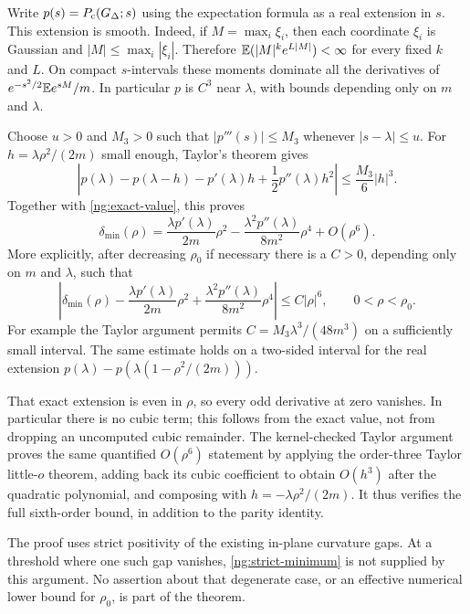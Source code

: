 Write $p(s)=P_{\mathrm c}(G_\Delta;s)$ using the expectation formula as a real
extension in $s$. This extension is smooth. Indeed, if
$M=\max_i\xi_i$, then each coordinate $\xi_i$ is Gaussian and
$|M|\le\max_i|\xi_i|$. Therefore
$\mathbb E(|M|^k e^{L|M|})<\infty$ for every fixed $k$ and $L$.
On compact $s$-intervals these moments dominate all the derivatives of
$e^{-s^2/2}\mathbb E e^{sM}/m$. In particular $p$ is $C^3$ near $\lambda$,
with bounds depending only on $m$ and $\lambda$.

Choose $u>0$ and $M_3>0$ such that
$|p'''(s)|\le M_3$ whenever $|s-\lambda|\le u$.
For $h=\lambda\rho^2/(2m)$ small enough, Taylor's theorem gives
\[
 \left|p(\lambda)-p(\lambda-h)
       -p'(\lambda)h+\frac12p''(\lambda)h^2\right|
       \le\frac{M_3}{6}|h|^3.
\]
Together with \eqref{ng:exact-value}, this proves
\begin{equation}\label{ng:O6}
 \delta_{\min}(\rho)
 =\frac{\lambda p'(\lambda)}{2m}\rho^2
    -\frac{\lambda^2p''(\lambda)}{8m^2}\rho^4+O(\rho^6).
\end{equation}
More explicitly, after decreasing $\rho_0$ if necessary there is a
$C>0$, depending only on $m$ and $\lambda$, such that
\begin{equation}\label{ng:quantified-remainder}
 \left|\delta_{\min}(\rho)
       -\frac{\lambda p'(\lambda)}{2m}\rho^2
       +\frac{\lambda^2p''(\lambda)}{8m^2}\rho^4\right|
 \le C|\rho|^6,\qquad 0<\rho<\rho_0.
\end{equation}
For example the Taylor argument permits $C=M_3\lambda^3/(48m^3)$
on a sufficiently small interval. The same estimate holds on a
two-sided interval for the real extension
$p(\lambda)-p(\lambda(1-\rho^2/(2m)))$.

That exact extension is even in $\rho$, so every odd derivative at zero
vanishes. In particular there is no cubic term; this follows from the
exact value, not from dropping an uncomputed cubic remainder.
The kernel-checked Taylor argument proves the same quantified
$O(\rho^6)$ statement by applying the order-three Taylor little-$o$
theorem, adding back its cubic coefficient to obtain
$O(h^3)$ after the quadratic polynomial, and composing with
$h=-\lambda\rho^2/(2m)$. It thus verifies the full sixth-order bound,
in addition to the parity identity.

The proof uses strict positivity of the existing in-plane curvature
gaps. At a threshold where one such gap vanishes,
\eqref{ng:strict-minimum} is not supplied by this argument.
No assertion about that degenerate case, or an effective numerical
lower bound for $\rho_0$, is part of the theorem.
